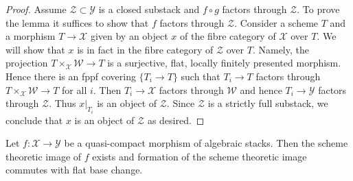 \begin{proof}
Assume $\mathcal{Z} \subset \mathcal{Y}$
is a closed substack and $f \circ g$ factors through $\mathcal{Z}$.
To prove the lemma it suffices to show
that $f$ factors through $\mathcal{Z}$.
Consider a scheme $T$ and a morphism $T \to \mathcal{X}$
given by an object $x$ of the fibre category of $\mathcal{X}$ over $T$.
We will show that $x$ is in fact in the fibre category of $\mathcal{Z}$
over $T$. Namely, the projection $T \times_\mathcal{X} \mathcal{W} \to T$
is a surjective, flat, locally finitely presented morphism.
Hence there is an fppf covering $\{T_i \to T\}$ such that
$T_i \to T$ factors through $T \times_\mathcal{X} \mathcal{W} \to T$
for all $i$. Then $T_i \to \mathcal{X}$ factors through $\mathcal{W}$
and hence $T_i \to \mathcal{Y}$ factors through $\mathcal{Z}$.
Thus $x|_{T_i}$ is an object of $\mathcal{Z}$.
Since $\mathcal{Z}$ is a strictly full substack, we conclude
that $x$ is an object of $\mathcal{Z}$ as desired.
\end{proof}

\begin{lemma}
\label{lemma-existence-plus-flat-base-change}
Let $f : \mathcal{X} \to \mathcal{Y}$ be a quasi-compact
morphism of algebraic stacks. Then the scheme theoretic image
of $f$ exists and formation of the scheme theoretic image
commutes with flat base change.
\end{lemma}

